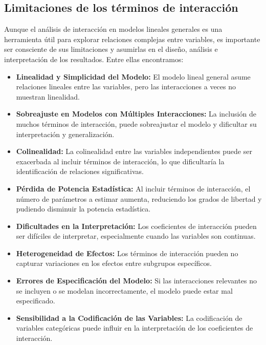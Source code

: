\documentclass[
  spanish,
  a4paper,
]{scrbook}
\begin{document}
\subsection{Limitaciones de los términos de
interacción}\label{limitaciones-de-los-tuxe9rminos-de-interacciuxf3n}

Aunque el análisis de interacción en modelos lineales generales es una
herramienta útil para explorar relaciones complejas entre variables, es
importante ser consciente de sus limitaciones y asumirlas en el diseño,
análisis e interpretación de los resultados. Entre ellas encontramos:

\begin{itemize}
\item
  \textbf{Linealidad y Simplicidad del Modelo:} El modelo lineal general
  asume relaciones lineales entre las variables, pero las interacciones
  a veces no muestran linealidad.
\item
  \textbf{Sobreajuste en Modelos con Múltiples Interacciones:} La
  inclusión de muchos términos de interacción, puede sobreajustar el
  modelo y dificultar su interpretación y generalización.
\item
  \textbf{Colinealidad:} La colinealidad entre las variables
  independientes puede ser exacerbada al incluir términos de
  interacción, lo que dificultaría la identificación de relaciones
  significativas.
\item
  \textbf{Pérdida de Potencia Estadística:} Al incluir términos de
  interacción, el número de parámetros a estimar aumenta, reduciendo los
  grados de libertad y pudiendo disminuir la potencia estadística.
\item
  \textbf{Dificultades en la Interpretación:} Los coeficientes de
  interacción pueden ser difíciles de interpretar, especialmente cuando
  las variables son continuas.
\item
  \textbf{Heterogeneidad de Efectos:} Los términos de interacción pueden
  no capturar variaciones en los efectos entre subgrupos específicos.
\item
  \textbf{Errores de Especificación del Modelo:} Si las interacciones
  relevantes no se incluyen o se modelan incorrectamente, el modelo
  puede estar mal especificado.
\item
  \textbf{Sensibilidad a la Codificación de las Variables:} La
  codificación de variables categóricas puede influir en la
  interpretación de los coeficientes de interacción.
\end{itemize}
\end{document}
